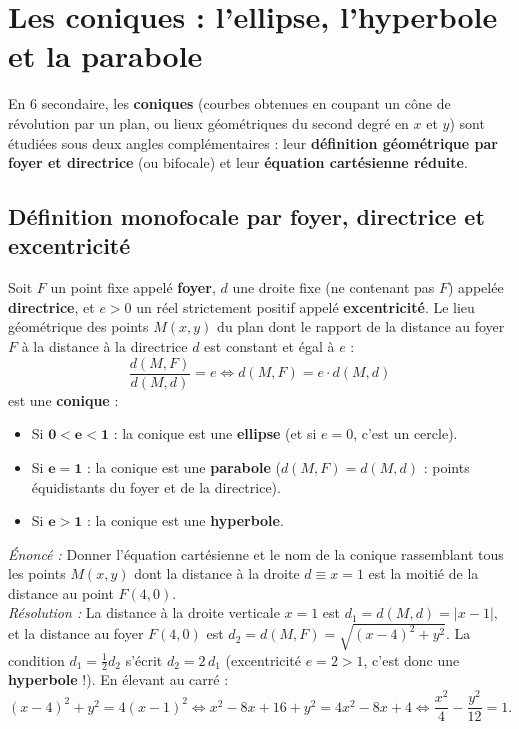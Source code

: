 \section{Les coniques : l'ellipse, l'hyperbole et la parabole}

En 6\ieme{} secondaire, les \textbf{coniques} (courbes obtenues en coupant un cône de révolution par un plan, ou lieux géométriques du second degré en $x$ et $y$) sont étudiées sous deux angles complémentaires : leur \textbf{définition géométrique par foyer et directrice} (ou bifocale) et leur \textbf{équation cartésienne réduite}.

\subsection{Définition monofocale par foyer, directrice et excentricité}

\begin{definition}
Soit $F$ un point fixe appelé \textbf{foyer}, $d$ une droite fixe (ne contenant pas $F$) appelée \textbf{directrice}, et $e > 0$ un réel strictement positif appelé \textbf{excentricité}. Le lieu géométrique des points $M(x,y)$ du plan dont le rapport de la distance au foyer $F$ à la distance à la directrice $d$ est constant et égal à $e$ :
\[
    \boxed{\frac{d(M, F)}{d(M, d)} = e \iff d(M, F) = e \cdot d(M, d)}
\]
est une \textbf{conique} :
\begin{itemize}
    \item Si $\mathbf{0 < e < 1}$ : la conique est une \textbf{ellipse} (et si $e = 0$, c'est un cercle).
    \item Si $\mathbf{e = 1}$ : la conique est une \textbf{parabole} ($d(M, F) = d(M, d)$ : points équidistants du foyer et de la directrice).
    \item Si $\mathbf{e > 1}$ : la conique est une \textbf{hyperbole}.
\end{itemize}
\end{definition}

\begin{exemple}
\emph{Énoncé :} Donner l'équation cartésienne et le nom de la conique rassemblant tous les points $M(x,y)$ dont la distance à la droite $d \equiv x = 1$ est la moitié de la distance au point $F(4, 0)$.\\
\emph{Résolution :} La distance à la droite verticale $x = 1$ est $d_1 = d(M, d) = |x - 1|$, et la distance au foyer $F(4,0)$ est $d_2 = d(M, F) = \sqrt{(x-4)^2 + y^2}$. La condition $d_1 = \frac{1}{2}d_2$ s'écrit $d_2 = 2\,d_1$ (excentricité $e = 2 > 1$, c'est donc une \textbf{hyperbole} !). En élevant au carré :
\[
    (x - 4)^2 + y^2 = 4(x - 1)^2 \iff x^2 - 8x + 16 + y^2 = 4x^2 - 8x + 4 \iff \boxed{\frac{x^2}{4} - \frac{y^2}{12} = 1}.
\]
\end{exemple}

